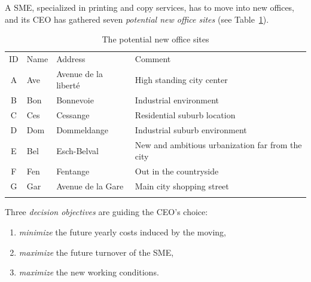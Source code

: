 A SME, specialized in printing and copy services, has to move into new offices, and its CEO has gathered seven \emph{potential new office sites} (see Table~\ref{tab:4.1}).
\begin{table}[h]
\caption{The potential new office sites}
\label{tab:4.1}       %
\begin{center}
    \begin{tabular}{c|l|l|l}
      \svhline\noalign{\smallskip}
      ID & Name & Address & Comment\\
      \noalign{\smallskip}\hline\noalign{\smallskip}
    A &   Ave  &  Avenue de la liberté &  High standing city center\\
    B &   Bon  &  Bonnevoie &             Industrial environment\\
    C &   Ces  &  Cessange &              Residential suburb location\\
    D &   Dom  &  Dommeldange &           Industrial suburb environment\\
    E &   Bel  &  Esch-Belval &           New and ambitious urbanization far from the city\\
    F &   Fen  &  Fentange &              Out in the countryside\\
      G &   Gar  &  Avenue de la Gare &     Main city shopping street\\
      \noalign{\smallskip}\hline
    \end{tabular}
\end{center}
\end{table}

Three \emph{decision objectives} are guiding the CEO's choice:
\begin{enumerate}[leftmargin=1cm]
\item \emph{minimize} the future yearly costs induced by the moving,
\item \emph{maximize} the future turnover of the SME,
\item \emph{maximize} the new working conditions.
\end{enumerate}

